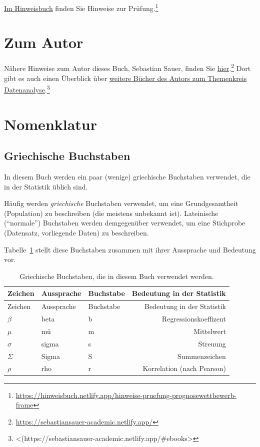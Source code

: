 \documentclass[
  a4paper,
  DIV=11]{scrreprt}
\begin{document}
\href{https://hinweisbuch.netlify.app/hinweise-pruefung-prognosewettbewerb-frame}{Im
Hinweisbuch} finden Sie Hinweise zur Prüfung.\footnote{\url{https://hinweisbuch.netlify.app/hinweise-pruefung-prognosewettbewerb-frame}}

\section{Zum Autor}\label{zum-autor}

Nähere Hinweise zum Autor dieses Buch, Sebastian Sauer, finden Sie
\href{https://sebastiansauer-academic.netlify.app/}{hier}.\footnote{\url{https://sebastiansauer-academic.netlify.app/}}
Dort gibt es auch einen Überblick über
\href{https://sebastiansauer-academic.netlify.app/\#ebooks}{weitere
Bücher des Autors zum Themenkreis Datenanalyse}.\footnote{\textless(https://sebastiansauer-academic.netlify.app/\#ebooks\textgreater{}}

\section{Nomenklatur}\label{nomenklatur}

\subsection{Griechische Buchstaben}\label{sec-greek}

In diesem Buch werden ein paar (wenige) griechische Buchstaben
verwendet, die in der Statistik üblich sind.

Häufig werden \emph{griechische} Buchstaben verwendet, um eine
Grundgesamtheit (Population) zu beschreiben (die meistens unbekannt
ist). Lateinische (``normale'') Buchstaben werden demgegenüber
verwendet, um eine Stichprobe (Datensatz, vorliegende Daten) zu
beschreiben.

Tabelle~\ref{tbl-griech} stellt diese Buchstaben zusammen mit ihrer
Aussprache und Bedeutung vor.

\begin{longtable}[]{@{}lllr@{}}
\caption{Griechische Buchstaben, die in diesem Buch verwendet
werden.}\label{tbl-griech}\tabularnewline
\toprule\noalign{}
Zeichen & Aussprache & Buchstabe & Bedeutung in der Statistik \\
\midrule\noalign{}
\endfirsthead
\toprule\noalign{}
Zeichen & Aussprache & Buchstabe & Bedeutung in der Statistik \\
\midrule\noalign{}
\endhead
\bottomrule\noalign{}
\endlastfoot
\(\beta\) & beta & b & Regressionskoeffizent \\
\(\mu\) & mü & m & Mittelwert \\
\(\sigma\) & sigma & s & Streuung \\
\(\Sigma\) & Sigma & S & Summenzeichen \\
\(\rho\) & rho & r & Korrelation (nach Pearson) \\
\end{longtable}
\end{document}

